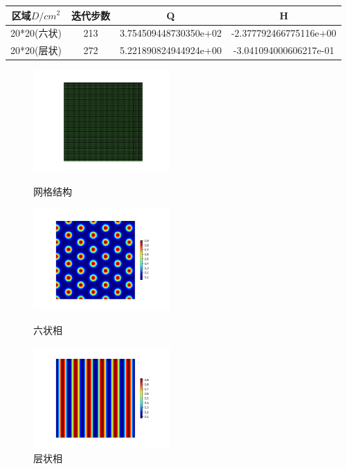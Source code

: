\documentclass[12pt]{article}
\begin{document}
\begin{CJK}{UTF8}{gkai}
\begin{table}[H]
\begin{tabular}{cccc}
     	    	\toprule
     	    	区域$D/cm^2$&迭代步数 & Q &  H \\
     	    	\midrule    20*20(六状)&213&3.754509448730350e+02&-2.377792466775116e+00\\
     	    	20*20(层状)&272& 5.221890824944924e+00 &-3.041094000606217e-01\\
     	    	\bottomrule
     	    \end{tabular}
     \end{table} 

    
\begin{figure}[H]
	\setlength{\abovecaptionskip}{0.cm}
	\setlength{\belowcaptionskip}{-0.cm}
	\begin{minipage}[!htbp]{0.3\linewidth}
		\includegraphics[width=5.2cm]{22.png}
		\caption*{网格结构}
	\end{minipage}
	\hspace{0.23in}
	\begin{minipage}[!htbp]{0.3\linewidth}
		\includegraphics[width=5.2cm]{scftfigure200.png}
		\caption*{六状相}
	\end{minipage}
	\hspace{0.23in}
	\begin{minipage}[!htbp]{0.3\linewidth}
		\includegraphics[width=5.2cm]{scftfigure240.png}
		\caption*{层状相}
	\end{minipage}	
\end{figure}
      

\end{CJK}
\end{document}
